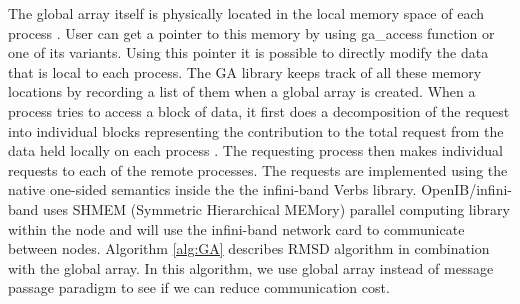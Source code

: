 The global array itself is physically located in the local memory space of each process \cite{GA}. 
User can get a pointer to this memory by using ga\_access function or one of its variants.
Using this pointer it is possible to directly modify the data that is local to each process.
The GA library keeps track of all these memory locations by recording a list of them when a global array is created. 
When a process tries to access a block of data, it first does a decomposition of the request into individual blocks representing the contribution to the total request from the data held locally on each process \cite{PNNL:2018}. 
The requesting process then makes individual requests to each of the remote processes. 
The requests are implemented using the native one-sided semantics inside the the infini-band Verbs library. 
OpenIB/infini-band uses SHMEM (Symmetric Hierarchical MEMory) parallel computing library  within the node and will use the infini-band network card to communicate between nodes.
Algorithm \ref{alg:GA} describes RMSD algorithm in combination with the global array.
In this algorithm, we use global array instead of message passage paradigm to see if we can reduce communication cost. 

